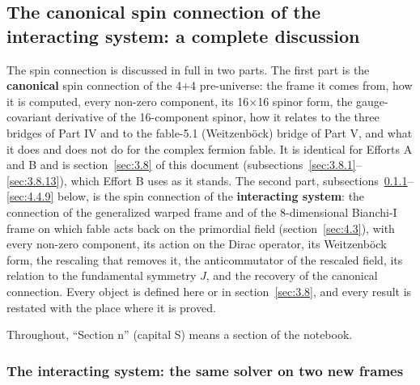 \subsection{The canonical spin connection of the interacting system: a complete discussion}
\label{sec:4.4}

The spin connection is discussed in full in two parts. The first part is the \textbf{canonical} spin connection of the 4+4 pre-universe: the frame it comes from, how it is computed, every non-zero component, its 16$\times$16 spinor form, the gauge-covariant derivative of the 16-component spinor, how it relates to the three bridges of Part IV and to the fable-5.1 (Weitzenböck) bridge of Part V, and what it does and does not do for the complex fermion fable. It is identical for Efforts A and B and is section~\ref{sec:3.8} of this document (subsections~\ref{sec:3.8.1}--\ref{sec:3.8.13}), which Effort B uses as it stands. The second part, subsections~\ref{sec:4.4.1}--\ref{sec:4.4.9} below, is the spin connection of the \textbf{interacting system}: the connection of the generalized warped frame and of the 8-dimensional Bianchi-I frame on which fable acts back on the primordial field (section~\ref{sec:4.3}), with every non-zero component, its action on the Dirac operator, its Weitzenböck form, the rescaling that removes it, the anticommutator of the rescaled field, its relation to the fundamental symmetry $J$, and the recovery of the canonical connection. Every object is defined here or in section~\ref{sec:3.8}, and every result is restated with the place where it is proved.

Throughout, ``Section n'' (capital S) means a section of the notebook.

\subsubsection{The interacting system: the same solver on two new frames}
\label{sec:4.4.1}

